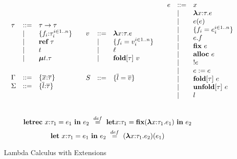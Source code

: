 \begin{figure*}
\centering
\[
\begin{array}{ccc}
\begin{array}{llll}
\tau & ::= & \tau \rightarrow \tau \\
     & \mathrel{\mid} & \{ f_i{:}\tau_i ^{i \in 1..n} \} \\
     & \mathrel{\mid} & \textbf{ref}~ \tau \\
     & \mathrel{\mid} & t \\
     & \mathrel{\mid} & \boldsymbol\mu t.\tau \\
\\[1ex]

\Gamma & ::= & \{ \overline{x} {:} \overline{\tau} \} \\

\Sigma & ::= & \{ \overline{l} {:} \overline{\tau} \} \\
\end{array}
&
\begin{array}{llll}
v    & ::= & \boldsymbol\lambda x{:}\tau . e \\
     & \mathrel{\mid} & \{ f_i = v_i ^{i \in 1..n} \}\\
     & \mathrel{\mid} & \ell \\
     & \mathrel{\mid} & \textbf{fold}[\tau]~ v \\
\\[1ex]

S & ::= & \{ \overline{l} = \overline{v} \} \\
\end{array}
&
\begin{array}{llll}
e    & ::= & x \\
     & \mathrel{\mid} & \boldsymbol\lambda x{:}\tau . e \\
     & \mathrel{\mid} & e(e) \\
     & \mathrel{\mid} & \{ f_i = e_i ^{i \in 1..n} \} \\
     & \mathrel{\mid} & e.f & \\
     & \mathrel{\mid} & \textbf{fix}~ e \\
     & \mathrel{\mid} & \textbf{alloc}~ e \\
     & \mathrel{\mid} & !e \\
     & \mathrel{\mid} & e := e \\
     & \mathrel{\mid} & \textbf{fold}[\tau]~ e \\
     & \mathrel{\mid} & \textbf{unfold}[\tau]~ e \\
     & \mathrel{\mid} & l \\
\\[1ex]
\end{array}
\\
\end{array}
\]
\[
\begin{array}{c}
\keyw{letrec}~ x{:}\tau_1 = e_1 ~\keyw{in}~ e_2 ~\buildrel {def}\over=~
\keyw{let} x{:}\tau_1 = \keyw{fix} (\boldsymbol\lambda x{:}\tau_1.e_1) ~\keyw{in}~ e_2\\[1ex]

\keyw{let}~ x{:}\tau_1 = e_1 ~\keyw{in}~ e_2 ~\buildrel {def}\over=~
(\boldsymbol\lambda x{:}\tau_1.e_2)(e_1)\\
\end{array}
\]
\caption{Lambda Calculus with Extensions}
\label{f-core1-syntax}
\end{figure*}
